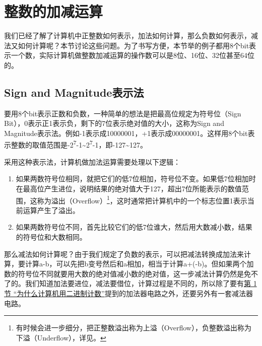 
\section{整数的加减运算}
%
我们已经了解了计算机中正整数如何表示，加法如何计算，那么负数如何表示，减法又如何计算呢？本节讨论这些问题。为了书写方便，本节举的例子都用8个bit表示一个数，实际计算机做整数加减运算的操作数可以是8位、16位、32位甚至64位的。


\subsection{Sign and Magnitude表示法}
%


要用8个bit表示正数和负数，一种简单的想法是把最高位规定为符号位（Sign Bit），0表示正1表示负，剩下的7位表示绝对值的大小，这称为Sign and Magnitude表示法。例如-1表示成10000001，+1表示成00000001。这样用8个bit表示整数的取值范围是-2\textsuperscript{7}-1\textasciitilde{}\BookSplit{}2\textsuperscript{7}-1，即-127\textasciitilde{}\BookSplit{}127。



采用这种表示法，计算机做加法运算需要处理以下逻辑：


\begin{enumerate}

\item 如果两数符号位相同，就把它们的低7位相加，符号位不变。如果低7位相加时在最高位产生进位，说明结果的绝对值大于127，超出7位所能表示的数值范围，这称为溢出（Overflow）\footnote[24]{有时候会进一步细分，把正整数溢出称为上溢（Overflow），负整数溢出称为下溢（Underflow），详见。}，这时通常把计算机中的一个标志位置1表示当前运算产生了溢出。

\item 如果两数符号位不同，首先比较它们的低7位谁大，然后用大数减小数，结果的符号位和大数相同。
\end{enumerate}


那么减法如何计算呢？由于我们规定了负数的表示，可以把减法转换成加法来计算，要计算a-b，可以先把b变号然后和a相加，相当于计算a+\BookSplit{}(-b)。但如果两个加数的符号位不同就要用大数的绝对值减小数的绝对值，这一步减法计算仍然是免不了的。我们知道加法要进位，减法要借位，计算过程是不同的，所以除了要有\hyperlink{db.ch14s01.id2752672}{第 1 节 “为什么计算机用二进制计数”}提到的加法器电路之外，还要另外有一套减法器电路。



